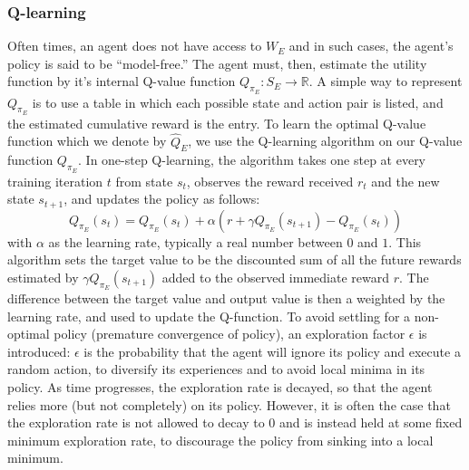 \documentclass[twocolumn]{article}
\begin{document}
	\subsubsection*{Q-learning}
	Often times, an agent does not have access to $W_E$ and in such cases, the 
	agent's policy is said to be ``model-free.'' The agent must, then, estimate 
	the utility function by it's internal Q-value function $Q_{\pi_E}: S_E \to 
	\mathbb R$. A simple way to represent $Q_{\pi_E}$ is to use a table in 
	which each possible state and action pair is listed, and the estimated 
	cumulative reward is the entry. To learn the optimal Q-value function 
	which we denote by $\hat{Q}_E$, we use the Q-learning algorithm on our 
	Q-value function $Q_{\pi_E}$. In one-step Q-learning, the algorithm takes 
	one step at every training iteration $t$ from state $s_t$, observes the 
	reward received $r_t$ 	and the new state $s_{t+1}$, and updates the policy 
	as follows: $$Q_{\pi_E}(s_t) = Q_{\pi_E}(s_t) + \alpha(r + \gamma 
	Q_{\pi_E}(s_{t+1}) - Q_{\pi_E}(s_t))$$ with $\alpha$ as the learning rate, 
	typically a real number between $0$ and $1$. This algorithm sets the target 
	value to be the discounted sum of all the future rewards estimated by 
	$\gamma Q_{\pi_E}(s_{t+1})$ added to the observed immediate reward $r$. The 
	difference between the target value and output value is then a weighted by 
	the learning rate, and used to update the Q-function. To avoid settling for 
	a non-optimal policy (premature convergence of policy), an exploration 
	factor $\epsilon$ is introduced: $\epsilon$ is the probability that the 
	agent will ignore its policy and execute a random action, to diversify its 
	experiences and to avoid local minima in its policy. As time progresses, 
	the exploration rate is decayed, so that the agent relies more (but not 
	completely) on its policy. However, it is often the case that the 
	exploration rate is not allowed to decay to $0$ and is instead held at some 
	fixed minimum exploration rate, to discourage the policy from sinking into 
	a local minimum.\\
	
\end{document}
